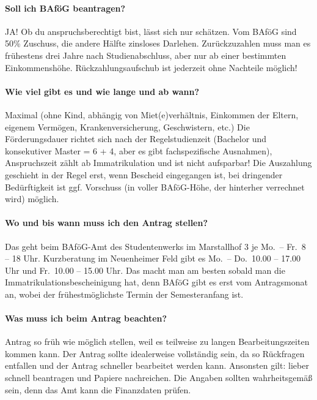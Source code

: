 
\paragraph{Soll ich BAföG beantragen?}
JA! Ob du anspruchsberechtigt bist, lässt sich nur schätzen. Vom BAföG sind 50\% Zuschuss, die andere Hälfte zinsloses Darlehen. Zurückzuzahlen muss man es  frühestens drei Jahre nach Studienabschluss, aber nur ab einer bestimmten Einkommenshöhe. Rückzahlungsaufschub ist jederzeit ohne Nachteile möglich!

\paragraph{Wie viel gibt es und wie lange und ab wann?}
Maximal  (ohne Kind, abhängig von Miet(e)verhältnis, Einkommen der Eltern, eigenem Vermögen, Krankenversicherung, Geschwistern, etc.)
Die Förderungsdauer richtet sich nach der Regelstudienzeit (Bachelor und konsekutiver Master = 6 + 4, aber es gibt fachspezifische Ausnahmen), Anspruchszeit zählt ab Immatrikulation und ist nicht aufsparbar! Die Auszahlung geschieht in der Regel erst, wenn Bescheid eingegangen ist, bei dringender Bedürftigkeit ist  ggf. Vorschuss (in voller BAföG-Höhe, der hinterher verrechnet wird) möglich.

\paragraph{Wo und bis wann muss ich den Antrag stellen?}
Das geht beim BAföG-Amt des Studentenwerks im Marstallhof 3 je Mo.\ -- Fr.\ 8 – 18 Uhr. Kurzberatung im Neuenheimer Feld gibt es Mo.\ – Do.\ 10.00 -- 17.00 Uhr und Fr.\ 10.00 -- 15.00 Uhr. Das macht man am besten sobald man die Immatrikulationsbescheinigung hat, denn BAföG gibt es erst vom Antragsmonat an, wobei der frühestmöglichste Termin der Semesteranfang ist.

\paragraph{Was muss ich beim Antrag beachten?}
Antrag so früh wie möglich stellen, weil es teilweise zu langen Bearbeitungszeiten kommen kann. Der Antrag sollte idealerweise vollständig sein, da so Rückfragen entfallen und der Antrag schneller bearbeitet werden kann. Ansonsten gilt: lieber schnell beantragen und Papiere nachreichen. Die Angaben sollten wahrheitsgemäß sein, denn das Amt kann die Finanzdaten prüfen.

